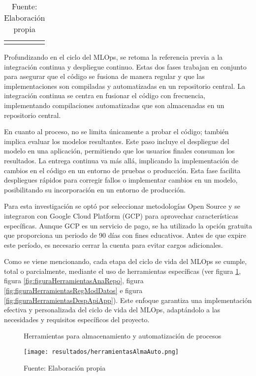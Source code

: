 \begin{longtable}{|p{3cm}|p{5cm}|p{6cm}|}
    \hline
    \caption*{\footnotesize Fuente: Elaboración propia}
    \label{tab:tabCicloMlops}
\end{longtable}

\newpage

Profundizando en el ciclo del MLOps, se retoma la referencia previa a la integración continua y despliegue continuo. Estas dos fases trabajan en conjunto para asegurar que el código se fusiona de manera regular y que las implementaciones son compiladas y automatizadas en un repositorio central. La integración continua se centra en fusionar el código con frecuencia, implementando compilaciones automatizadas que son almacenadas en un repositorio central. \newline

En cuanto al proceso, no se limita únicamente a probar el código; también implica evaluar los modelos resultantes. Este paso incluye el despliegue del modelo en una aplicación, permitiendo que los usuarios finales consuman los resultados. La entrega continua va más allá, implicando la implementación de cambios en el código en un entorno de pruebas o producción. Esta fase facilita despliegues rápidos para corregir fallos o implementar cambios en un modelo, posibilitando su incorporación en un entorno de producción. \newline

Para esta investigación se optó por seleccionar metodologías Open Source y se integraron  con Google Cloud Platform (GCP) para aprovechar características específicas. Aunque GCP es un servicio de pago, se ha utilizado la opción gratuita que proporciona un periodo de 90 días con fines educativos. Antes de que expire este período, es necesario cerrar la cuenta para evitar cargos adicionales. \newline

Como se viene mencionando, cada etapa del ciclo de vida del MLOps se cumple, total o parcialmente, mediante el uso de herramientas específicas (ver figura \ref{fig:figuraHerramientasAlmaAuto}, figura \ref{fig:figuraHerramientasAnaRepo}, figura \ref{fig:figuraHerramientasRegModDatos} e figura \ref{fig:figuraHerramientasDespApiApp}). Este enfoque garantiza una implementación efectiva y personalizada del ciclo de vida del MLOps, adaptándolo a las necesidades y requisitos específicos del proyecto.

\begin{figure}[h]
\centering
\caption{Herramientas para almacenamiento y automatización de procesos}
\texttt{[image: resultados/herramientasAlmaAuto.png]}
\caption*{\footnotesize Fuente: Elaboración propia}
\label{fig:figuraHerramientasAlmaAuto}
\end{figure}

